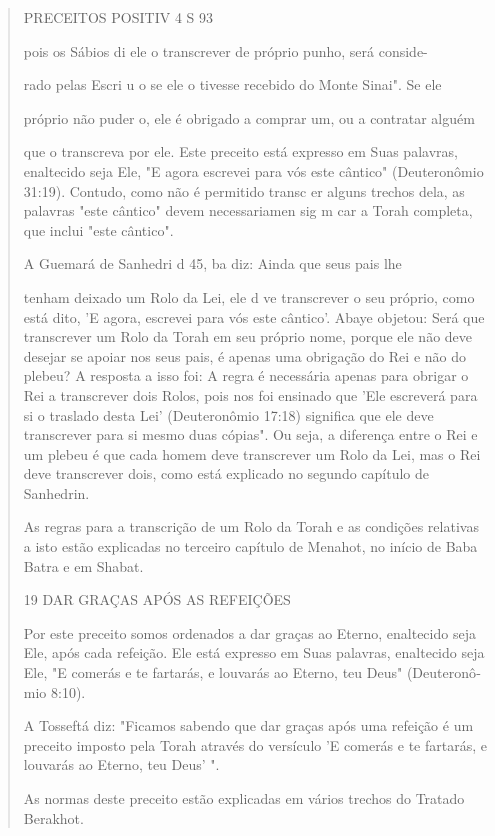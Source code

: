 \begin{quote}
PRECEITOS POSITIV 4 S 93

pois os Sábios di ele o transcrever de próprio punho, será conside-

rado pelas Escri u o se ele o tivesse recebido do Monte Sinai". Se ele

próprio não puder o, ele é obrigado a comprar um, ou a contratar alguém

que o transcreva por ele. Este preceito está expresso em Suas palavras,
enalte­cido seja Ele, "E agora escrevei para vós este cântico"
(Deuteronômio 31:19). Contudo, como não é permitido transc er alguns
trechos dela, as palavras "este cântico" devem necessariamen sig m car a
Torah completa, que inclui "este cântico".

A Guemará de Sanhedri d 45, ba diz: Ainda que seus pais lhe

tenham deixado um Rolo da Lei, ele d ve transcrever o seu próprio, como
está dito, 'E agora, escrevei para vós este cântico'. Abaye objetou:
Será que trans­crever um Rolo da Torah em seu próprio nome, porque ele
não deve desejar se apoiar nos seus pais, é apenas uma obrigação do Rei
e não do plebeu? A res­posta a isso foi: A regra é necessária apenas
para obrigar o Rei a transcrever dois Rolos, pois nos foi ensinado que
'Ele escreverá para si o traslado desta Lei' (Deu­teronômio 17:18)
significa que ele deve transcrever para si mesmo duas cópias". Ou seja,
a diferença entre o Rei e um plebeu é que cada homem deve transcre­ver
um Rolo da Lei, mas o Rei deve transcrever dois, como está explicado no
segundo capítulo de Sanhedrin.

As regras para a transcrição de um Rolo da Torah e as condições
re­lativas a isto estão explicadas no terceiro capítulo de Menahot, no
início de Ba­ba Batra e em Shabat.

19 DAR GRAÇAS APÓS AS REFEIÇÕES

Por este preceito somos ordenados a dar graças ao Eterno, enalteci­do
seja Ele, após cada refeição. Ele está expresso em Suas palavras,
enaltecido seja Ele, "E comerás e te fartarás, e louvarás ao Eterno, teu
Deus" (Deuteronô­mio 8:10).

A Tosseftá diz: "Ficamos sabendo que dar graças após uma refeição é um
preceito imposto pela Torah através do versículo 'E comerás e te
fartarás, e louvarás ao Eterno, teu Deus' ".

As normas deste preceito estão explicadas em vários trechos do Tra­tado
Berakhot.


\end{quote}
